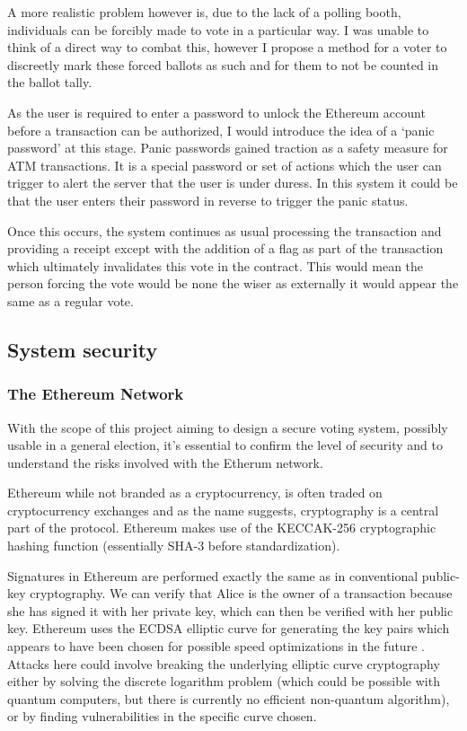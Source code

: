 \documentclass{article}
\begin{document}
	A more realistic problem however is, due to the lack of a polling booth, individuals can be forcibly made to vote in a particular way. I was unable to think of a direct way to combat this, however I propose a method for a voter to discreetly mark these forced ballots as such and for them to not be counted in the ballot tally.
	
	As the user is required to enter a password to unlock the Ethereum account before a transaction can be authorized, I would introduce the idea of a `panic password' at this stage. Panic passwords gained traction as a safety measure for ATM transactions. It is a special password or set of actions which the user can trigger to alert the server that the user is under duress. In this system it could be that the user enters their password in reverse to trigger the panic status.
	
	Once this occurs, the system continues as usual processing the transaction and providing a receipt except with the addition of a flag as part of the transaction which ultimately invalidates this vote in the contract. This would mean the person forcing the vote would be none the wiser as externally it would appear the same as a regular vote.	
	
	\clearpage
	\subsection{System security}
	\subsubsection{The Ethereum Network}
	 With the scope of this project aiming to design a secure voting system, possibly usable in a general election, it's essential to confirm the level of security and to understand the risks involved with the Etherum network.

Ethereum while not branded as a cryptocurrency, is often traded on cryptocurrency exchanges and as the name suggests, cryptography is a central part of the protocol. Ethereum makes use of the KECCAK-256 cryptographic hashing function (essentially SHA-3 before standardization).

Signatures in Ethereum are performed exactly the same as in conventional public-key cryptography. We can verify that Alice is the owner of a transaction because she has signed it with her private key, which can then be verified with her public key. Ethereum uses the ECDSA elliptic curve for generating the key pairs which appears to have been chosen for possible speed optimizations in the future \citep{41_yang_2011}. Attacks here could involve breaking the underlying elliptic curve cryptography either by solving the discrete logarithm problem (which could be possible with quantum computers, but there is currently no efficient non-quantum algorithm), or by finding vulnerabilities in the specific curve chosen.
\end{document}
